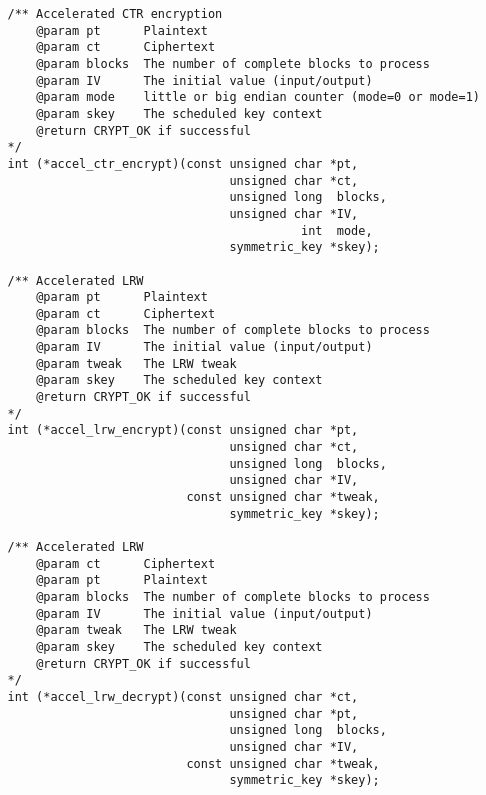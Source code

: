\documentclass[synpaper]{book}
\begin{document}
\begin{small}
\begin{verbatim}
   /** Accelerated CTR encryption
       @param pt      Plaintext
       @param ct      Ciphertext
       @param blocks  The number of complete blocks to process
       @param IV      The initial value (input/output)
       @param mode    little or big endian counter (mode=0 or mode=1)
       @param skey    The scheduled key context
       @return CRYPT_OK if successful
   */
   int (*accel_ctr_encrypt)(const unsigned char *pt,
                                  unsigned char *ct,
                                  unsigned long  blocks,
                                  unsigned char *IV,
                                            int  mode,
                                  symmetric_key *skey);

   /** Accelerated LRW
       @param pt      Plaintext
       @param ct      Ciphertext
       @param blocks  The number of complete blocks to process
       @param IV      The initial value (input/output)
       @param tweak   The LRW tweak
       @param skey    The scheduled key context
       @return CRYPT_OK if successful
   */
   int (*accel_lrw_encrypt)(const unsigned char *pt,
                                  unsigned char *ct,
                                  unsigned long  blocks,
                                  unsigned char *IV,
                            const unsigned char *tweak,
                                  symmetric_key *skey);

   /** Accelerated LRW
       @param ct      Ciphertext
       @param pt      Plaintext
       @param blocks  The number of complete blocks to process
       @param IV      The initial value (input/output)
       @param tweak   The LRW tweak
       @param skey    The scheduled key context
       @return CRYPT_OK if successful
   */
   int (*accel_lrw_decrypt)(const unsigned char *ct,
                                  unsigned char *pt,
                                  unsigned long  blocks,
                                  unsigned char *IV,
                            const unsigned char *tweak,
                                  symmetric_key *skey);


\end{verbatim}
\end{small}
\end{document}
